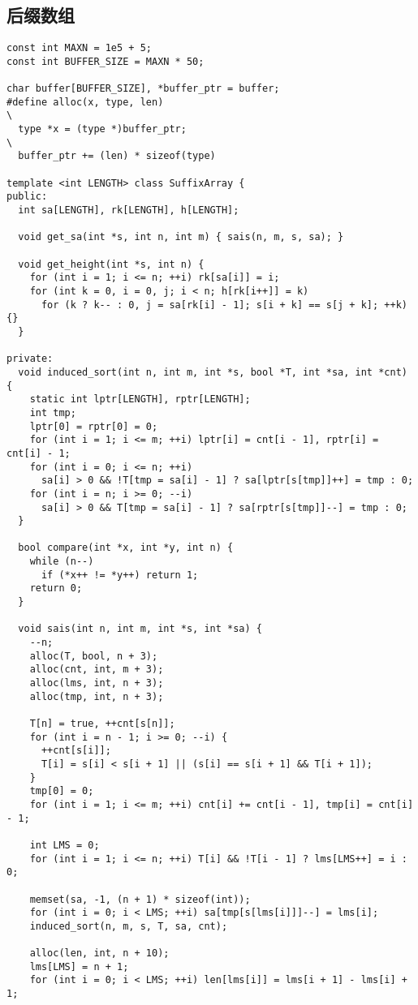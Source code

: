 \documentclass[twoside]{article}
\begin{document}
\subsection{后缀数组}
\begin{lstlisting}
const int MAXN = 1e5 + 5;
const int BUFFER_SIZE = MAXN * 50;

char buffer[BUFFER_SIZE], *buffer_ptr = buffer;
#define alloc(x, type, len)                                                    \
  type *x = (type *)buffer_ptr;                                                \
  buffer_ptr += (len) * sizeof(type)

template <int LENGTH> class SuffixArray {
public:
  int sa[LENGTH], rk[LENGTH], h[LENGTH];

  void get_sa(int *s, int n, int m) { sais(n, m, s, sa); }

  void get_height(int *s, int n) {
    for (int i = 1; i <= n; ++i) rk[sa[i]] = i;
    for (int k = 0, i = 0, j; i < n; h[rk[i++]] = k)
      for (k ? k-- : 0, j = sa[rk[i] - 1]; s[i + k] == s[j + k]; ++k) {}
  }

private:
  void induced_sort(int n, int m, int *s, bool *T, int *sa, int *cnt) {
    static int lptr[LENGTH], rptr[LENGTH];
    int tmp;
    lptr[0] = rptr[0] = 0;
    for (int i = 1; i <= m; ++i) lptr[i] = cnt[i - 1], rptr[i] = cnt[i] - 1;
    for (int i = 0; i <= n; ++i)
      sa[i] > 0 && !T[tmp = sa[i] - 1] ? sa[lptr[s[tmp]]++] = tmp : 0;
    for (int i = n; i >= 0; --i)
      sa[i] > 0 && T[tmp = sa[i] - 1] ? sa[rptr[s[tmp]]--] = tmp : 0;
  }

  bool compare(int *x, int *y, int n) {
    while (n--)
      if (*x++ != *y++) return 1;
    return 0;
  }

  void sais(int n, int m, int *s, int *sa) {
    --n;
    alloc(T, bool, n + 3);
    alloc(cnt, int, m + 3);
    alloc(lms, int, n + 3);
    alloc(tmp, int, n + 3);

    T[n] = true, ++cnt[s[n]];
    for (int i = n - 1; i >= 0; --i) {
      ++cnt[s[i]];
      T[i] = s[i] < s[i + 1] || (s[i] == s[i + 1] && T[i + 1]);
    }
    tmp[0] = 0;
    for (int i = 1; i <= m; ++i) cnt[i] += cnt[i - 1], tmp[i] = cnt[i] - 1;

    int LMS = 0;
    for (int i = 1; i <= n; ++i) T[i] && !T[i - 1] ? lms[LMS++] = i : 0;

    memset(sa, -1, (n + 1) * sizeof(int));
    for (int i = 0; i < LMS; ++i) sa[tmp[s[lms[i]]]--] = lms[i];
    induced_sort(n, m, s, T, sa, cnt);

    alloc(len, int, n + 10);
    lms[LMS] = n + 1;
    for (int i = 0; i < LMS; ++i) len[lms[i]] = lms[i + 1] - lms[i] + 1;


\end{lstlisting}
\end{document}
